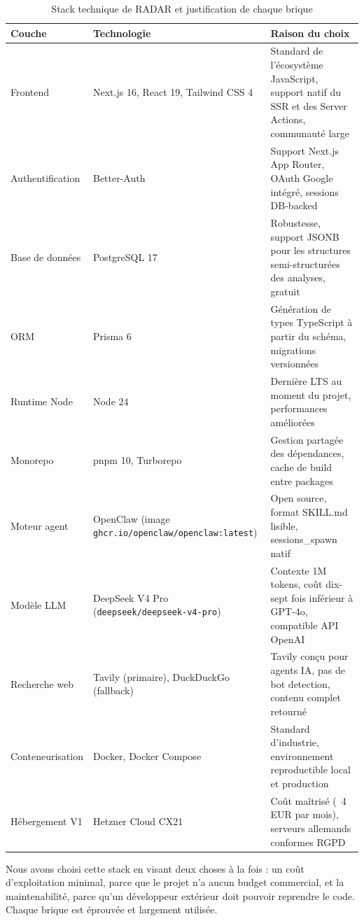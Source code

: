 \documentclass[12pt,a4paper,openany]{report}
\begin{document}
\begin{table}[H]
  \centering
  \caption{Stack technique de RADAR et justification de chaque brique}
  \label{tab:stack}
  \small
  \begin{tabularx}{\linewidth}{lYY}
    \toprule
    \textbf{Couche} & \textbf{Technologie} & \textbf{Raison du choix} \\
    \midrule
    Frontend & Next.js 16, React 19, Tailwind CSS 4 & Standard de l'écosystème JavaScript, support natif du SSR et des Server Actions, communauté large \\
    Authentification & Better-Auth & Support Next.js App Router, OAuth Google intégré, sessions DB-backed \\
    Base de données & PostgreSQL 17 & Robustesse, support JSONB pour les structures semi-structurées des analyses, gratuit \\
    ORM & Prisma 6 & Génération de types TypeScript à partir du schéma, migrations versionnées \\
    Runtime Node & Node 24 & Dernière LTS au moment du projet, performances améliorées \\
    Monorepo & pnpm 10, Turborepo & Gestion partagée des dépendances, cache de build entre packages \\
    Moteur agent & OpenClaw (image \texttt{ghcr.io/openclaw/openclaw:latest}) & Open source, format SKILL.md lisible, sessions\_spawn natif \\
    Modèle LLM & DeepSeek V4 Pro (\texttt{deepseek/deepseek-v4-pro}) & Contexte 1M tokens, coût dix-sept fois inférieur à GPT-4o, compatible API OpenAI \\
    Recherche web & Tavily (primaire), DuckDuckGo (fallback) & Tavily conçu pour agents IA, pas de bot detection, contenu complet retourné \\
    Conteneurisation & Docker, Docker Compose & Standard d'industrie, environnement reproductible local et production \\
    Hébergement V1 & Hetzner Cloud CX21 & Coût maîtrisé (~4 EUR par mois), serveurs allemands conformes RGPD \\
    \bottomrule
  \end{tabularx}
\end{table}

Nous avons choisi cette stack en visant deux choses à la fois : un coût d'exploitation minimal, parce que le projet n'a aucun budget commercial, et la maintenabilité, parce qu'un développeur extérieur doit pouvoir reprendre le code. Chaque brique est éprouvée et largement utilisée.
\end{document}

